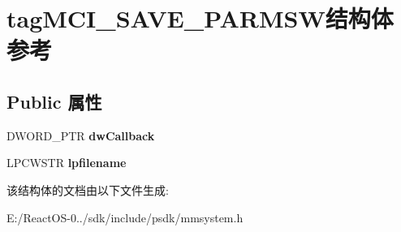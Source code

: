 \hypertarget{structtag_m_c_i___s_a_v_e___p_a_r_m_s_w}{}\section{tag\+M\+C\+I\+\_\+\+S\+A\+V\+E\+\_\+\+P\+A\+R\+M\+S\+W结构体 参考}
\label{structtag_m_c_i___s_a_v_e___p_a_r_m_s_w}
\subsection*{Public 属性}
\begin{DoxyCompactItemize}
\item 
\mbox{\label{structtag_m_c_i___s_a_v_e___p_a_r_m_s_w_acebd0675046f1a55a963ea99ed11aea3}} 
D\+W\+O\+R\+D\+\_\+\+P\+TR {\bfseries dw\+Callback}
\item 
\mbox{\label{structtag_m_c_i___s_a_v_e___p_a_r_m_s_w_ab0d020fd4c9cce2c4755361938e9e203}} 
L\+P\+C\+W\+S\+TR {\bfseries lpfilename}
\end{DoxyCompactItemize}


该结构体的文档由以下文件生成\+:\begin{DoxyCompactItemize}
\item 
E\+:/\+React\+O\+S-\/0../sdk/include/psdk/mmsystem.\+h\end{DoxyCompactItemize}
